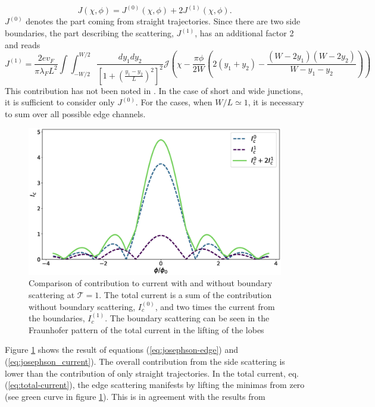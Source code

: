 \begin{equation}
J \left( \chi, \phi \right) = J^{(0)} \left( \chi, \phi \right)  + 2 J^{(1)} \left( \chi, \phi \right).\label{eq:total-current}
\end{equation}
$J^{(0)}$ denotes the part coming from straight trajectories. Since there are two side boundaries, the part describing the scattering, $J^{(1)}$, has an additional factor 2 and reads
\begin{equation}
J^{(1)} = \frac{2 e v_F}{\pi \lambda_F L^2} \int \int_{-W/2}^{W/2} \frac{d y_1 d y_2}{ \left[ 1 + \left(\frac{y_1 - y_2}{L}\right)^2\right]^{2}} \mathcal{J} \left( \chi - \frac{\pi \phi}{2 W} \left( 2 (y_1 + y_2) - \frac{(W-2y_1)(W-2y_2)}{W - y_1 - y_2} \right)\right) \label{eq:josephson-edge}
\end{equation}
This contribution has not been noted in \cite{Meier2016}. In the case of short and wide junctions, it is sufficient to consider only $J^{(0)}$. For the cases, when $W / L \simeq 1$, it is necessary to sum over all possible edge channels.
\begin{figure}
\centering
\includegraphics[width=\textwidth]{figure/analyticalmodel/plane-setup-edge-contribution}
\caption{Comparison of contribution  to current with and without boundary scattering at $\mathcal{T} =1$. The total current is a sum of the contribution without boundary scattering, $I_c^{(0)}$, and two times the current from the boundaries, $I_c^{(1)}$. The boundary scattering can be seen in the Fraunhofer pattern of the total current in the lifting of the lobes}\label{fig:plane-edge-contribution}
\end{figure}
Figure \ref{fig:plane-edge-contribution} shows the result of equations (\ref{eq:josephson-edge}) and (\ref{eq:josephson_current}). The overall contribution from the side scattering is lower than the contribution of only straight trajectories. In the total current, eq. (\ref{eq:total-current}), the edge scattering manifests by lifting the minimas from zero (see green curve in figure \ref{fig:plane-edge-contribution}). This is in agreement with the results from \cite{Meier2016}

